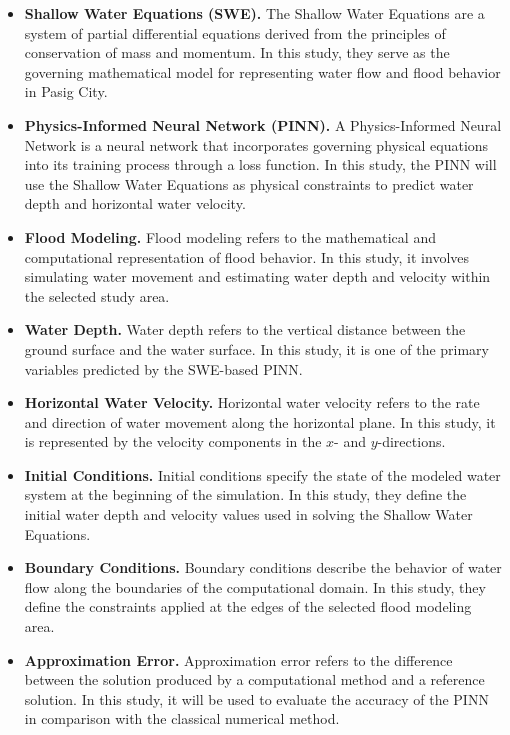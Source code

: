 \begin{itemize}

    \item \textbf{Shallow Water Equations (SWE).}
    The Shallow Water Equations are a system of partial differential equations derived from the principles of conservation of mass and momentum. In this study, they serve as the governing mathematical model for representing water flow and flood behavior in Pasig City.

    \item \textbf{Physics-Informed Neural Network (PINN).}
    A Physics-Informed Neural Network is a neural network that incorporates governing physical equations into its training process through a loss function. In this study, the PINN will use the Shallow Water Equations as physical constraints to predict water depth and horizontal water velocity.

    \item \textbf{Flood Modeling.}
    Flood modeling refers to the mathematical and computational representation of flood behavior. In this study, it involves simulating water movement and estimating water depth and velocity within the selected study area.

    \item \textbf{Water Depth.}
    Water depth refers to the vertical distance between the ground surface and the water surface. In this study, it is one of the primary variables predicted by the SWE-based PINN.

    \item \textbf{Horizontal Water Velocity.}
    Horizontal water velocity refers to the rate and direction of water movement along the horizontal plane. In this study, it is represented by the velocity components in the $x$- and $y$-directions.

    \item \textbf{Initial Conditions.}
    Initial conditions specify the state of the modeled water system at the beginning of the simulation. In this study, they define the initial water depth and velocity values used in solving the Shallow Water Equations.

    \item \textbf{Boundary Conditions.}
    Boundary conditions describe the behavior of water flow along the boundaries of the computational domain. In this study, they define the constraints applied at the edges of the selected flood modeling area.

    \item \textbf{Approximation Error.}
    Approximation error refers to the difference between the solution produced by a computational method and a reference solution. In this study, it will be used to evaluate the accuracy of the PINN in comparison with the classical numerical method.


\end{itemize}
